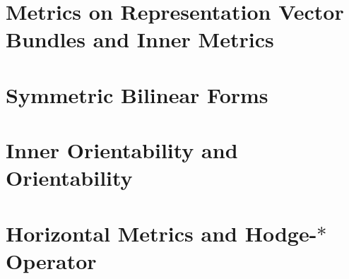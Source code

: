 \section{Metrics on Representation Vector Bundles and Inner Metrics}


\section{Symmetric Bilinear Forms}



\section{Inner Orientability and Orientability}

\section{Horizontal Metrics and Hodge-$*$ Operator}

